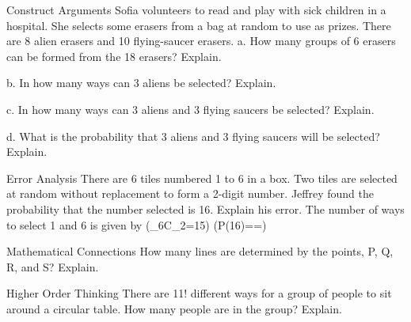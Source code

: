 \documentclass{article}
\newenvironment{practice}[2]{}{}        %
\newcommand{\answer}[1]{}               %
\newcommand{\placeholder}[2]{}          %
\newcommand{\te}[1]{}                   %
\begin{document}
\begin{practice}{18}{3}
Construct Arguments Sofia volunteers to read and play with sick children in a hospital. She selects some erasers from a bag at random to use as prizes. There are 8 alien erasers and 10 flying-saucer erasers.
a. How many groups of 6 erasers can be formed from the 18 erasers? Explain.
\answer{a. 18,564; the order does not matter, so there are ({}_{18}C_6=18,564) groups of 6 erasers.}
b. In how many ways can 3 aliens be selected? Explain.
\answer{b. 56; there are 8 aliens, so there are ({}_8C_3=56) ways to choose 3 aliens.}
c. In how many ways can 3 aliens and 3 flying saucers be selected? Explain.
\answer{c. 6,720; there are 10 flying saucers, so there are ({}_{10}C_3=120) ways to choose 3 flying saucers. Then multiply by the answer to part b.}
d. What is the probability that 3 aliens and 3 flying saucers will be selected? Explain.
\answer{d. 0.36; the probability is the ratio of the number of favorable outcomes (the answer to part c) to the total number of possible outcomes (the answer to part a). (\frac{6,720}{18,564}\approx0.36)}
\end{practice}
\begin{practice}{19}{3}
Error Analysis There are 6 tiles numbered 1 to 6 in a box. Two tiles are selected at random without replacement to form a 2-digit number. Jeffrey found the probability that the number selected is 16. Explain his error.
The number of ways to select 1 and 6 is given by ({}_6C_2=15)
(P(16)==)
\placeholder{illustration}{Pale curled note with Jeffrey's incorrect combination calculation transcribed above and red X.}
\answer{The order is important in this problem. The number of ways to select 1 and 6 to form 16 is given by ({}_6P_2), not ({}_6C_2); (P(16)=\frac1{{}_6P_2}=\frac1{30}).}
\end{practice}
\begin{practice}{20}{2}
Mathematical Connections How many lines are determined by the points, P, Q, R, and S? Explain.
\placeholder{diagram}{Four black points, none collinear, no axes or connecting lines: P lower left, Q slightly higher to its right, R lower and further right, S highest and furthest right. Labels above left of each point.}
\answer{6; any two points form a line and the order is not important. Because ({}_4C_2=6), 6 lines can be determined by the four points.}
\end{practice}
\begin{practice}{21}{3}
Higher Order Thinking There are 11! different ways for a group of people to sit around a circular table. How many people are in the group? Explain.
\answer{12; because the people are sitting around a circular table, the first position is determined and the order of the remaining 11 people is 11!.}
\te{Answer printed on next page.}
\end{practice}
\end{document}
